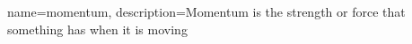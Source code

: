 {
    name=momentum,
    description={Momentum is the strength or force that something has when it is moving}
} 

